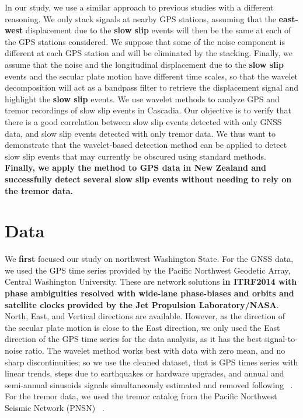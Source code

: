 \documentclass{article}
\begin{document}
In our study, we use a similar approach to previous studies with a different reasoning. We only stack signals at nearby GPS stations, assuming that the \textbf{east-west} displacement due to the \textbf{slow slip} events will then be the same at each of the GPS stations considered. We suppose that some of the noise component is different at each GPS station and will be eliminated by the stacking. Finally, we assume that the noise and the longitudinal displacement due to the \textbf{slow slip} events and the secular plate motion have different time scales, so that the wavelet decomposition will act as a bandpass filter to retrieve the displacement signal and highlight the \textbf{slow slip} events. We use wavelet methods to analyze GPS and tremor recordings of slow slip events in Cascadia. Our objective is to verify that there is a good correlation between slow slip events detected with only GNSS data, and slow slip events detected with only tremor data. We thus want to demonstrate that the wavelet-based detection method can be applied to detect slow slip events that may currently be obscured using standard methods. \textbf{Finally, we apply the method to GPS data in New Zealand and successfully detect several slow slip events without needing to rely on the tremor data.} \\

\section{Data}

We \textbf{first} focused our study on northwest Washington State. For the GNSS data, we used the GPS time series provided by the Pacific Northwest Geodetic Array, Central Washington University. These are network solutions \textbf{in ITRF2014 with phase ambiguities resolved with wide-lane phase-biases and orbits and satellite clocks provided by the Jet Propulsion Laboratory/NASA}. North, East, and Vertical directions are available. However, as the direction of the secular plate motion is close to the East direction, we only used the East direction of the GPS time series for the data analysis, as it has the best signal-to-noise ratio. The wavelet method works best with data with zero mean, and no sharp discontinuities; so we use the cleaned dataset, that is GPS times series with linear trends, steps due to earthquakes or hardware upgrades, and annual and semi-annual sinusoids signals simultaneously estimated and removed following ~\citet{SZE_2004}. For the tremor data, we used the tremor catalog from the Pacific Northwest Seismic Network (PNSN) ~\citep{WEC_2010}. \\
\end{document}

